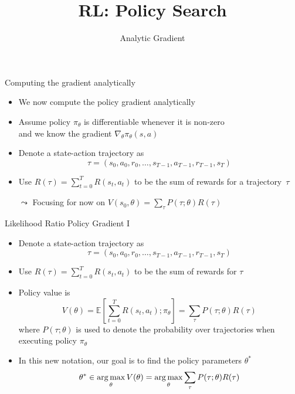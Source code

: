 


\title[RL: Analytic Gradient]{RL: Policy Search}
\subtitle{Analytic Gradient}




	
	\maketitle

\begin{frame}[c]{Computing the gradient analytically}

\begin{itemize}
	\item We now compute the policy gradient analytically
	\item Assume policy $\pi_\theta$ is differentiable whenever it is non-zero\\
	 and we know the gradient $\nabla_\theta \pi_\theta (s,a)$
	\item Denote a state-action trajectory as 
	$$ \tau = (s_0, a_0, r_0, \ldots, s_{T-1}, a_{T-1}, r_{T-1}, s_T) $$
	\item Use $R(\tau) = \sum_{t=0}^{T} R(s_t, a_t)$ to be the sum of rewards for a trajectory~$\tau$
	\item[$\leadsto$] Focusing for now on $V(s_0, \theta) = \sum_\tau P(\tau; \theta) R(\tau)$ 
	
\end{itemize}

\end{frame}
\begin{frame}[c]{Likelihood Ratio Policy Gradient I }
	
	\begin{itemize}
		\item Denote a state-action trajectory as 
		$$ \tau = (s_0, a_0, r_0, \ldots, s_{T-1}, a_{T-1}, r_{T-1}, s_T) $$
		\item Use $R(\tau) = \sum_{t=0}^{T} R(s_t, a_t)$ to be the sum of rewards for $\tau$
		\item Policy value is 
		$$V(\theta) = \mathbb{E}\left[\sum_{t=0}^T R(s_t, a_t); \pi_\theta \right] = \sum_{\tau} P(\tau; \theta)R(\tau) $$
		where $P(\tau; \theta)$ is used to denote the probability over trajectories when executing policy $\pi_\theta$
		\item In this new notation, our goal is to find the policy parameters $\theta^*$
		$$\theta^* \in \operatorname*{arg\,max}_{\theta} V(\theta) = \operatorname*{arg\,max}_{\theta}\sum_{\tau} P(\tau; \theta) R(\tau) $$
		
	\end{itemize}
	
\end{frame}
